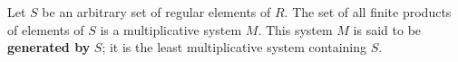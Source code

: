 Let $S$ be an arbitrary set of regular elements of $R$. The set of all finite products of elements of $S$ is a multiplicative system $M$. This system $M$ is said to be \textbf{generated by} $S$; it is the least multiplicative system containing $S$.
